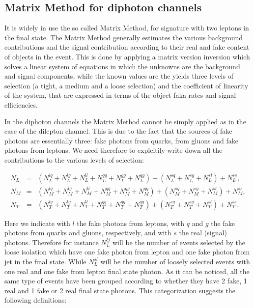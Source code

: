 

\subsection{Matrix Method for diphoton channels}

It is widely in use the so called Matrix Method, for signature with two leptons in the final state. The Matrix Method generally estimates the various background contributions and the signal contribution according to their real and fake content of objects in the event. This is done by applying a matrix version inversion which solves a linear system of equations in which the unknowns are the background and signal components, while the known values are the yields three levels of selection (a tight, a medium and a loose selection) and the coefficient of linearity of the system, that are expressed in terms of the object faka rates and signal efficiencies.

In the diphoton channels the Matrix Method cannot be simply applied as in the case of the dilepton channel. This is due to the fact that the sources of fake photons are essentially three: fake photons from quarks, from gluons and fake photons from leptons. We need therefore to explcitily write down all the contributions to the various levels of selection:

\begin{eqnarray}
N_{L} & = & \left( N_{L}^{lq} + N_{L}^{lg} + N_{L}^{ll} + N_{L}^{qq} + N_{L}^{gg} + N_{L}^{qg} \right) + \left( N_{L}^{sq} + N_{L}^{sg} + N_{L}^{sl} \right) + N_{L}^{ss}, \label{eq:mm1_}\\
N_{M} & = & \left( N_{M}^{lq} + N_{M}^{lg} + N_{M}^{ll} + N_{M}^{qq} + N_{M}^{gg} + N_{M}^{qg} \right) + \left( N_{M}^{sq} + N_{M}^{sg} + N_{M}^{sl} \right) + N_{M}^{ss}, \label{eq:mm2_}\\
N_{T} & = & \left( N_{T}^{lq} + N_{T}^{lg} + N_{T}^{ll} + N_{T}^{qq} + N_{T}^{gg} + N_{T}^{qg} \right) + \left( N_{T}^{sq} + N_{T}^{sg} + N_{T}^{sl} \right) + N_{T}^{ss}. \label{eq:mm3_}
\end{eqnarray}

Here we indicate with $l$ the fake photons from leptons, with $q$ and $g$ the fake photons from quarks and gluons, respectively, and with $s$ the real (signal) photons. Therefore for instance $N_{L}^{lj}$ will be the number of events selected by the loose isolation which have one fake photon from lepton and one fake photon from jet in the final state. While $N_{L}^{sl}$ will be the number of loosely selected events with one real and one fake from lepton final state photon. As it can be noticed, all the same type of events have been grouped according to whether they have 2 fake, 1 real and 1 fake or 2 real final state photons. This categorization suggests the following definitions:

